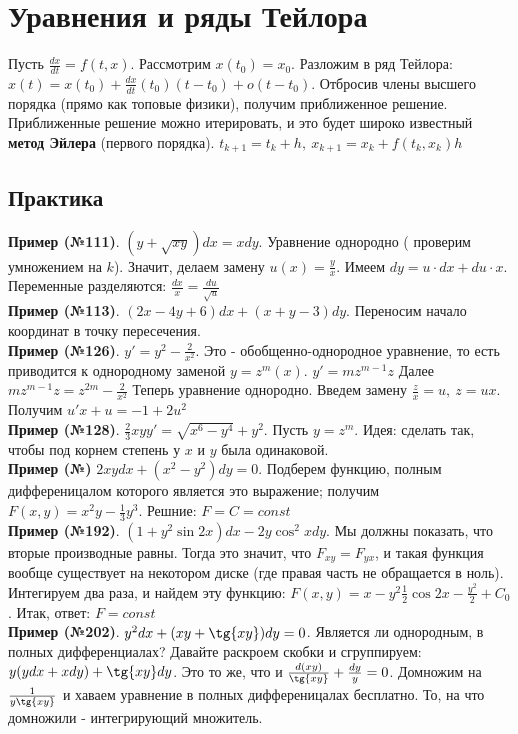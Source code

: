 \section{Уравнения и ряды Тейлора}
Пусть $\frac{dx}{dt}=f(t,x)$. Рассмотрим $x(t_0)=x_0$. Разложим в ряд
Тейлора: $x(t)=x(t_0)+\frac{dx}{dt}(t_0)(t-t_0)+o(t-t_0)$.
Отбросив члены высшего порядка (прямо как топовые физики), получим 
приближенное решение. Приближенные решение можно итерировать, и это
будет широко известный \textbf{метод Эйлера} (первого
порядка). $t_{k+1}=t_k+h,~x_{k+1}=x_k+f(t_k,x_k)h$ 

\subsection{Практика}
\textbf{Пример (№111)}. $(y+\sqrt{xy})dx=xdy$. Уравнение однородно (
проверим умножением на $k$). Значит, делаем замену $u(x)=\frac{y}{x}$.
Имеем $dy=u\cdot dx+du\cdot x$. Переменные разделяются: 
$\frac{dx}{x}=\frac{du}{\sqrt{u}}$\\
\textbf{Пример (№113)}. $(2x-4y+6)dx+(x+y-3)dy$. Переносим начало координат
в точку пересечения.\\
\textbf{Пример (№126)}. $y'=y^2-\frac{2}{x^2}$. Это - обобщенно-однородное
уравнение, то есть приводится к однородному заменой $y=z^m(x)$.
$y'=mz^{m-1}z$ Далее
$mz^{m-1}z=z^{2m}-\frac{2}{x^2}$ 
Теперь уравнение однородно. Введем замену $\frac{z}{x}=u,~z=ux$.
Получим $u'x+u=-1+2u^2$\\
\textbf{Пример (№128)}. $\frac{2}{3}xyy'=\sqrt{x^6-y^4}+y^2$. 
Пусть $y=z^m$. Идея: сделать так, чтобы под корнем степень у $x$ и $y$ была
одинаковой.\\
\textbf{Пример (№)} $2xydx+(x^2-y^2)dy=0$. Подберем функцию, полным 
дифференицалом которого является это выражение; получим  $F(x,y)=
x^2y-\frac{1}{3}y^3$. Решние: $F=C=const$\\
\textbf{Пример (№192)}. $(1+y^2\sin{2x})dx-2y\cos^2{x}dy$. Мы должны 
показать, что вторые производные равны. Тогда это значит, что
$F_{xy}=F_{yx}$, и такая функция вообще существует на некотором диске
(где правая часть не обращается в ноль). Интегируем два раза, и найдем эту
функцию: $F(x,y)=x-y^2 \frac{1}{2}\cos{2x}-\frac{y^2}{2}+C_0$.
Итак, ответ: $\boxed{F=const}$ \\
\textbf{Пример (№202)}. $y^2dx+(xy+\tg{xy})dy=0$. Является ли однородным,
в полных дифференциалах? Давайте раскроем скобки и сгруппируем:
$y(ydx+xdy)+\tg{xy}dy$. Это то же, что и  $\frac{d(xy)}{\tg{xy}}+\frac{dy}{y}
=0$. Домножим на $\frac{1}{y\tg{xy}}$ и хаваем уравнение в полных 
дифференицалах бесплатно. То, на что домножили - интегрирующий множитель.














